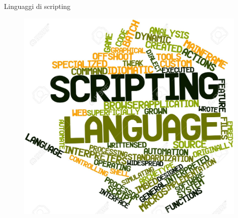 \begin{frame}{Linguaggi di scripting}
	\begin{figure}
		\hspace*{-7cm}
		\includegraphics[scale=0.07]{res/scripting}
	\end{figure}

\end{frame}